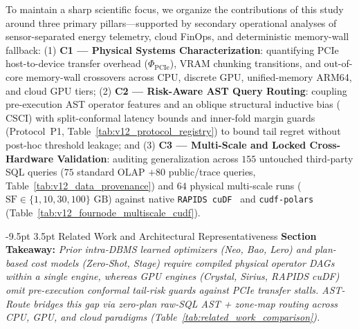 \documentclass[10pt,a4paper]{article}
\makeatletter
\renewcommand\section{\@startsection{section}{1}{\z@}%
  {-9.5pt \@plus -2pt \@minus -1.5pt}%
  {3.5pt \@plus 1pt}%
  {\normalfont\large\bfseries}}
\makeatother
\begin{document}

To maintain a sharp scientific focus, we organize the contributions of this study around three primary pillars---supported by secondary operational analyses of sensor-separated energy telemetry, cloud FinOps, and deterministic memory-wall fallback:
(1) \textbf{C1 --- Physical Systems Characterization}: quantifying PCIe host-to-device transfer overhead ($\Phi_{\text{PCIe}}$), VRAM chunking transitions, and out-of-core memory-wall crossovers across CPU, discrete GPU, unified-memory ARM64, and cloud GPU tiers;
(2) \textbf{C2 --- Risk-Aware AST Query Routing}: coupling pre-execution AST operator features and an oblique structural inductive bias ($\text{CSCI}$) with split-conformal latency bounds and inner-fold margin guards (Protocol~P1, Table~\ref{tab:v12_protocol_registry}) to bound tail regret without post-hoc threshold leakage; and
(3) \textbf{C3 --- Multi-Scale and Locked Cross-Hardware Validation}: auditing generalization across $155$ untouched third-party SQL queries ($75$ standard OLAP $+ 80$ public/trace queries, Table~\ref{tab:v12_data_provenance}) and $64$ physical multi-scale runs ($\text{SF}\in\{1,10,30,100\}\text{ GB}$) against native \texttt{RAPIDS cuDF}~\cite{rapids2024cudf} and \texttt{cudf-polars} (Table~\ref{tab:v12_fournode_multiscale_cudf}).

\section{Related Work and Architectural Representativeness}
\noindent\textbf{Section Takeaway:} \emph{Prior intra-DBMS learned optimizers (Neo, Bao, Lero) and plan-based cost models (Zero-Shot, Stage) require compiled physical operator DAGs within a single engine, whereas GPU engines (Crystal, Sirius, RAPIDS cuDF) omit pre-execution conformal tail-risk guards against PCIe transfer stalls. AST-Route bridges this gap via zero-plan raw-SQL AST + zone-map routing across CPU, GPU, and cloud paradigms (Table~\ref{tab:related_work_comparison}).}\par\vspace{2pt}
\end{document}
